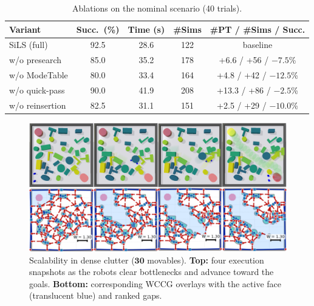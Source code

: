 \begin{table}[t]
\centering
\caption{Ablations on the nominal scenario (40 trials).}
\label{tab:ablation}
\vspace{2pt}
\setlength{\tabcolsep}{3pt}
\renewcommand{\arraystretch}{0.95}
\begin{tabular}{lcccc}
\toprule
Variant & Succ.~(\%) & Time (s) & \#Sims & \#PT / \#Sims / Succ. \\
\midrule
SiLS (full)          & 92.5 & 28.6 & 122 & baseline \\
w/o presearch        & 85.0 & 35.2 & 178 & +6.6 / +56 / $-7.5$\% \\
w/o ModeTable        & 80.0 & 33.4 & 164 & +4.8 / +42 / $-12.5$\% \\
w/o quick-pass       & 90.0 & 41.9 & 208 & +13.3 / +86 / $-2.5$\% \\
w/o reinsertion      & 82.5 & 31.1 & 151 & +2.5 / +29 / $-10.0$\% \\
\bottomrule
\end{tabular}
\end{table}
\begin{figure}[t!]
  \centering
  \includegraphics[width=0.95\linewidth]{figures/scalability.png}
  \vspace{-2mm}
 \caption{Scalability in dense clutter ($\boldsymbol{30}$ movables). 
  \textbf{Top:} four execution snapshots as the robots clear bottlenecks and advance toward the goals. 
  \textbf{Bottom:} corresponding WCCG overlays with the active face (translucent blue) and ranked gaps. 
  }
\label{fig:scalability}
\vspace{-4mm}
\end{figure}

